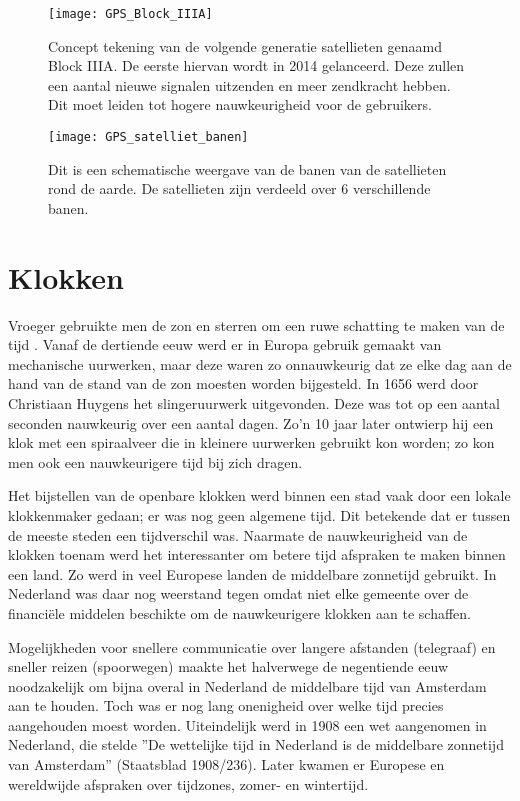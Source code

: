 \begin{figure}
    \centering
    \texttt{[image: GPS\_Block\_IIIA]}
    \caption{Concept tekening van de volgende generatie \gps satellieten
    genaamd \gps Block IIIA. De eerste hiervan wordt in 2014 gelanceerd.
    Deze zullen een aantal nieuwe signalen uitzenden en meer zendkracht
    hebben. Dit moet leiden tot hogere nauwkeurigheid voor de gebruikers.}
    \label{fig:GPSBlockIIIA}
\end{figure}

\begin{figure}
    \centering
    \texttt{[image: GPS\_satelliet\_banen]}
    \caption{Dit is een schematische weergave van de banen van de \gps
    satellieten rond de aarde. De satellieten zijn verdeeld over 6
    verschillende banen.}
    \label{fig:GPS_satelliet_banen}
\end{figure}


\section{Klokken}

Vroeger gebruikte men de zon en sterren om een ruwe schatting te maken
van de tijd \cite{gent2003wet}. Vanaf de dertiende eeuw werd er in
Europa gebruik gemaakt van mechanische uurwerken, maar deze waren zo
onnauwkeurig dat ze elke dag aan de hand van de stand van de zon moesten worden
bijgesteld. In 1656 werd door Christiaan Huygens het slingeruurwerk
uitgevonden. Deze was tot op een aantal seconden nauwkeurig over een
aantal dagen. Zo'n 10 jaar later ontwierp hij een klok met een
spiraalveer die in kleinere uurwerken gebruikt kon worden; zo kon men
ook een nauwkeurigere tijd bij zich dragen.

Het bijstellen van de openbare klokken werd binnen een stad vaak door
een lokale klokkenmaker gedaan; er was nog geen algemene tijd. Dit
betekende dat er tussen de meeste steden een tijdverschil was. Naarmate
de nauwkeurigheid van de klokken toenam werd het interessanter om betere tijd
afspraken te maken binnen een land. Zo werd in veel Europese landen de
middelbare zonnetijd gebruikt. In Nederland was daar nog weerstand tegen
omdat niet elke gemeente over de financiële middelen beschikte om de
nauwkeurigere klokken aan te schaffen.

Mogelijkheden voor snellere communicatie over langere afstanden
(telegraaf) en sneller reizen (spoorwegen) maakte het halverwege de
negentiende eeuw noodzakelijk om bijna overal in Nederland de middelbare
tijd van Amsterdam aan te houden. Toch was er nog lang onenigheid over
welke tijd precies aangehouden moest worden. Uiteindelijk werd in 1908
een wet aangenomen in Nederland, die stelde ''De wettelijke tijd in
Nederland is de middelbare zonnetijd van Amsterdam'' (Staatsblad
1908/236). Later kwamen er Europese en wereldwijde afspraken over
tijdzones, zomer- en wintertijd.

